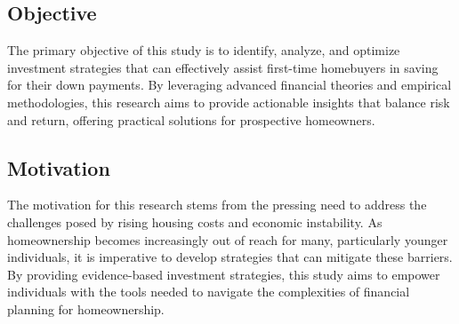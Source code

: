 \subsection{Objective}
The primary objective of this study is to identify, analyze, and optimize investment strategies that can effectively assist first-time homebuyers in saving for their down payments. By leveraging advanced financial theories and empirical methodologies, this research aims to provide actionable insights that balance risk and return, offering practical solutions for prospective homeowners.

\subsection{Motivation}
The motivation for this research stems from the pressing need to address the challenges posed by rising housing costs and economic instability. As homeownership becomes increasingly out of reach for many, particularly younger individuals, it is imperative to develop strategies that can mitigate these barriers. By providing evidence-based investment strategies, this study aims to empower individuals with the tools needed to navigate the complexities of financial planning for homeownership.
